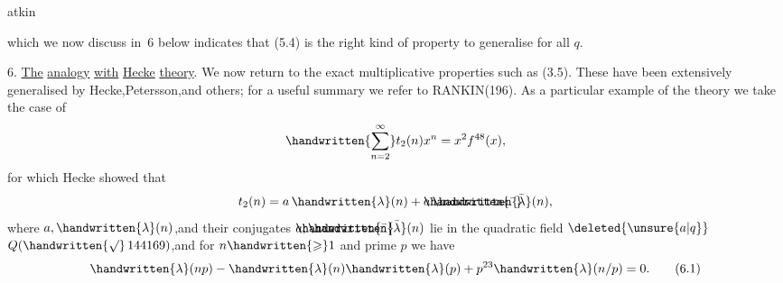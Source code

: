 \begin{flushright}
atkin 
\end{flushright}

\noindent which we now discuss  in \handwritten{\S}\,6 below indicates that (5.4) is the right kind of property to generalise for all \uline{$q$}.

6. \uline{The} \uline{analogy} \uline{with} \uline{Hecke} \uline{theory}. We now return to the exact multiplicative properties such as (3.5). These have been extensively generalised by Hecke,Petersson,and others; for a useful summary we refer to RANKIN(196\hspace{.6em}). As a particular example of the theory we take the case of
\[
\handwritten{\sum_{n=2}^{\infty}}t_{2}(n)x^{n}=x^{2}f^{48}(x),
\]
for which Hecke showed that
\[
t_{2}(n)=a\,\handwritten{\lambda}(n)+\mathord{\rlap{$\handwritten{\bar{\phantom{a}}}$}a}\,\handwritten{\bar{\lambda}}(n),
\]
where $a,\handwritten{\lambda}(n)$,and their conjugates $\mathord{\rlap{$\handwritten{\bar{\phantom{a}}}$}a},\handwritten{\bar{\lambda}}(n)$ lie in the quadratic field $\deleted{\unsure{a|q}}$\reversemarginpar{} $Q(\handwritten{\surd}\,144169)$,and for $n\handwritten{\geqslant}1$ and prime $p$ we have
\[
\handwritten{\lambda}(np)-\handwritten{\lambda}(n)\handwritten{\lambda}(p)+p^{23}\handwritten{\lambda}(n/p)=0.
\tag*{(6.1)}
\]

